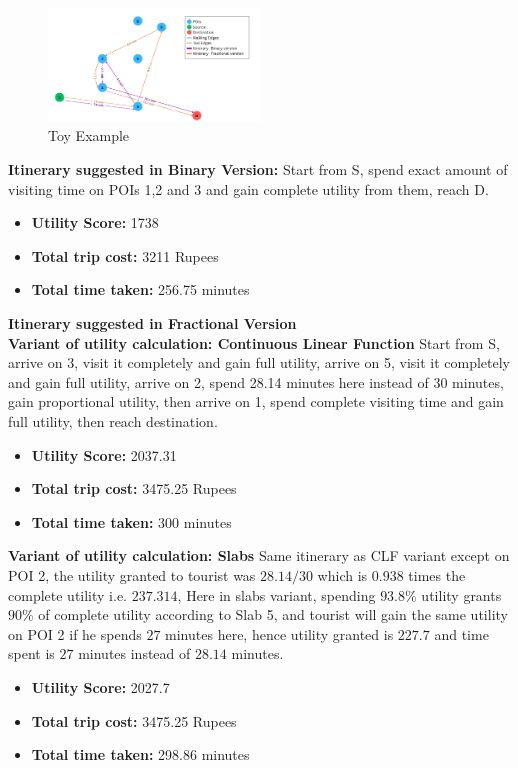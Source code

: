 \documentclass[sigconf,authordraft]{acmart}
\begin{document}
\begin{figure}[H]
\centering
\includegraphics[width=0.5\textwidth]{toy.png}
\caption{Toy Example}
\label{fig:sample_image}
\end{figure}

\noindent \textbf{Itinerary suggested in Binary Version:}
Start from S, spend exact amount of visiting time on POIs 1,2 and 3 and gain complete utility from them, reach D.
\begin{itemize}
    \item \textbf{Utility Score:} 1738
    \item \textbf{Total trip cost:} 3211 Rupees
    \item \textbf{Total time taken:} 256.75 minutes
\end{itemize}

\noindent \textbf{Itinerary suggested in Fractional Version}\\
\textbf{Variant of utility calculation: Continuous Linear Function}
Start from S, arrive on 3, visit it completely and gain full utility, arrive on 5, visit it completely and gain full utility, arrive on 2, spend 28.14 minutes here instead of 30 minutes, gain proportional utility, then arrive on 1, spend complete visiting time and gain full utility, then reach destination.
\begin{itemize}
    \item \textbf{Utility Score:} 2037.31
    \item \textbf{Total trip cost:} 3475.25 Rupees
    \item \textbf{Total time taken:} 300 minutes
\end{itemize}

\noindent \textbf{Variant of utility calculation: Slabs}
Same itinerary as CLF variant except on POI 2, the utility granted to tourist was $28.14/30$
which is $0.938$ times the complete utility i.e. $237.314$, Here in slabs variant, spending $93.8\%$ utility grants $90\%$ of complete utility according to Slab 5, and tourist will gain the same utility on POI 2 if he spends $27$ minutes here, hence utility granted is $227.7$ and time spent is $27$ minutes instead of $28.14$ minutes.
\begin{itemize}
    \item \textbf{Utility Score:} 2027.7
    \item \textbf{Total trip cost:} 3475.25 Rupees
    \item \textbf{Total time taken:} 298.86 minutes
\end{itemize}
\end{document}
